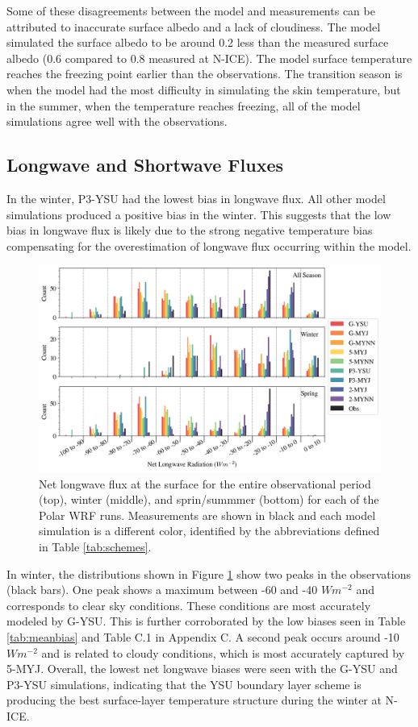 Some of these disagreements between the model and measurements can be attributed to inaccurate surface albedo and a lack of cloudiness. The model simulated the surface albedo to be around 0.2 less than the measured surface albedo (0.6 compared to 0.8 measured at N-ICE). The model surface temperature reaches the freezing point earlier than the observations. The transition season is when the model had the most difficulty in simulating the skin temperature, but in the summer, when the temperature reaches freezing, all of the model simulations agree well with the observations. 

\subsection{Longwave and Shortwave Fluxes}
In the winter, P3-YSU had the lowest bias in longwave flux. All other model simulations produced a positive bias in the winter. This suggests that the low bias in longwave flux is likely due to the strong negative temperature bias compensating for the overestimation of longwave flux occurring within the model. 

  \begin{figure}[t]
    \centering
    \includegraphics[width=1\linewidth]{figures/chapter3/WRF_NetLW_Histo.png}
    \caption[Polar WRF simulated net longwave flux histograms.]{Net longwave flux at the surface for the entire observational period (top), winter (middle), and sprin/summmer (bottom) for each of the Polar WRF runs. Measurements are shown in black and each model simulation is a different color, identified by the abbreviations defined in Table \ref{tab:schemes}.}
    \label{fig:wrf_netlw}
\end{figure}

 In winter, the distributions shown in Figure \ref{fig:wrf_netlw} show two peaks in the observations (black bars). One peak shows a maximum between -60 and -40 $Wm^{-2}$ and corresponds to clear sky conditions. These conditions are most accurately modeled by G-YSU. This is further corroborated by the low biases seen in Table \ref{tab:meanbias} and Table C.1 in Appendix C. A second peak occurs around -10 $Wm^{-2}$ and is related to cloudy conditions, which is most accurately captured by 5-MYJ. Overall, the lowest net longwave biases were seen with the G-YSU and P3-YSU simulations, indicating that the YSU boundary layer scheme is producing the best surface-layer temperature structure during the winter at N-ICE. 
 
